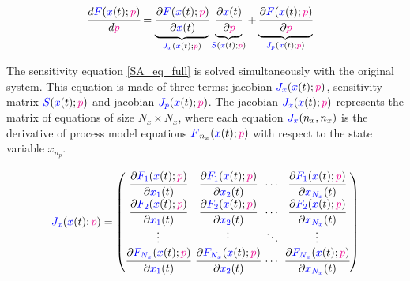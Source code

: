\documentclass[../Article_Model_Parameters.tex]{subfiles}
\begin{document}
	{\footnotesize
		\begin{align}		
			\label{SA_eq_full}\cfrac{d {\color{blue}F}({\color{blue}x}(t);{\color{magenta}p})}{d {\color{magenta}p}} &=  \underbrace{ \cfrac{\partial {\color{blue}F}({\color{blue}x}(t);{\color{magenta}p})}{\partial {\color{blue}x}(t)} }_{{\color{blue}J_x}({\color{blue}x}(t);{\color{magenta}p})} \underbrace{\cfrac{\partial {\color{blue}x}(t)}{\partial {\color{magenta}p}} }_{{\color{blue}S}({\color{blue}x}(t);{\color{magenta}p})} + \underbrace{ \cfrac{\partial {\color{blue}F}({\color{blue}x}(t);{\color{magenta}p})}{\partial {\color{magenta}p}} }_{{\color{blue}J_p}({\color{blue}x}(t);{\color{magenta}p})}
	\end{align} }
	
	The sensitivity equation \ref{SA_eq_full} is solved simultaneously with the original system. This equation is made of three terms: jacobian ${\color{blue}J_x}({\color{blue}x}(t);{\color{magenta}p})$, sensitivity matrix ${\color{blue}S}({\color{blue}x}(t);{\color{magenta}p})$ and jacobian ${\color{blue}J_p}({\color{blue}x}(t);{\color{magenta}p})$. The jacobian ${\color{blue}J_x}({\color{blue}x}(t);{\color{magenta}p})$ represents the matrix of equations of size $N_x \times N_x$, where each equation ${\color{blue}J_x}(n_x,n_x)$ is the derivative of process model equations ${\color{blue}F}_{n_x}({\color{blue}x}(t);{\color{magenta}p})$ with respect to the state variable $x_{n_p}$.
	
	{\footnotesize
		\begin{align}
			\begingroup %
			\setlength\arraycolsep{2pt}
			{\color{blue}J_x}({\color{blue}x}(t);{\color{magenta}p})=\begin{pmatrix}
				\cfrac{\partial {\color{blue}F_{1}}({\color{blue}x}(t);{\color{magenta}p})}{\partial {\color{blue}x_{1}}(t)} & \cfrac{\partial {\color{blue}F_{1}}({\color{blue}x}(t);{\color{magenta}p})}{\partial {\color{blue}x_{2}}(t)} & \cdots & \cfrac{\partial {\color{blue}F_{1}}({\color{blue}x}(t);{\color{magenta}p})}{\partial {\color{blue}x_{N_x}}(t)}\\
				\cfrac{\partial {\color{blue}F_{2}}({\color{blue}x}(t);{\color{magenta}p})}{\partial {\color{blue}x_{1}}(t)} & \cfrac{\partial {\color{blue}F_{2}}({\color{blue}x}(t);{\color{magenta}p})}{\partial {\color{blue}x_{2}}(t)} & \cdots & \cfrac{\partial {\color{blue}F_{2}}({\color{blue}x}(t);{\color{magenta}p})}{\partial {\color{blue}x_{N_x}}(t)}\\
				\vdots & \vdots & \ddots & \vdots\\ 
				\cfrac{\partial {\color{blue}F_{N_x}}({\color{blue}x}(t);{\color{magenta}p})}{\partial {\color{blue}x_{1}}(t)} & \cfrac{\partial {\color{blue}F_{N_x}}({\color{blue}x}(t);{\color{magenta}p})}{\partial {\color{blue}x_{2}}(t)} & \cdots & \cfrac{\partial {\color{blue}F_{N_x}}({\color{blue}x}(t);{\color{magenta}p})}{\partial {\color{blue}x_{N_x}}(t)}\\
			\end{pmatrix}
			\endgroup
	\end{align} }
	
\end{document}
